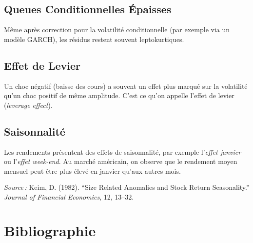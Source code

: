 \documentclass[14pt]{extarticle} %
\begin{document}
\subsection{Queues Conditionnelles Épaisses}

Même après correction pour la volatilité conditionnelle (par exemple via un modèle GARCH), les résidus restent souvent leptokurtiques.

\subsection{Effet de Levier}

Un choc négatif (baisse des cours) a souvent un effet plus marqué sur la volatilité qu’un choc positif de même amplitude. C’est ce qu’on appelle l’effet de levier (\emph{leverage effect}).

\subsection{Saisonnalité}

Les rendements présentent des effets de saisonnalité, par exemple l’\emph{effet janvier} ou l’\emph{effet week-end}. Au marché américain, on observe que le rendement moyen mensuel peut être plus élevé en janvier qu’aux autres mois.

\textit{Source :}  
Keim, D. (1982). “Size Related Anomalies and Stock Return Seasonality.” \emph{Journal of Financial Economics}, 12, 13–32.

\section*{Bibliographie}
\end{document}
